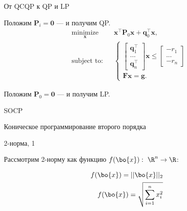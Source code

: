 \documentclass{beamer}
\begin{document}
\begin{frame}{От QCQP к QP и LP}
	\begin{flushleft}
		
		Положим $\mathbf{P}_i = \mathbf{0}$ — и получим QP.
		\begin{equation}
			\begin{aligned}
				& \underset{\mathbf{x}}{\text{minimize}}
				& & \mathbf{x}^\top \mathbf{P}_0 \mathbf{x} + \mathbf{q}_0^\top\mathbf{x}, \\
				& \text{subject to:}
				& & \begin{cases}
					\begin{bmatrix} 
						\mathbf{q}_1^\top \\ ... \\ \mathbf{q}_n^\top
					\end{bmatrix} 
					\mathbf{x} \leq
					\begin{bmatrix} 
						-r_1 \\ ... \\ -r_n
					\end{bmatrix} \\
					\mathbf{F}\mathbf{x} = \mathbf{g}.
				\end{cases}
			\end{aligned}
		\end{equation}
		
		Положим $\mathbf{P}_0 = \mathbf{0}$ — и получим LP.
		
	\end{flushleft}
\end{frame}


\begin{frame}{SOCP}
	
	{\huge Коническое программирование второго порядка}
	
\end{frame}




\begin{frame}{2-норма, 1}
	\begin{flushleft}
		
		Рассмотрим 2-норму как функцию $f(\bo{x}): \ \R^n \rightarrow \R$:
		
		\begin{align}
			f(\bo{x}) = || \bo{x} ||_2
			\\
			f(\bo{x}) = \sqrt{ \sum_{i=1}^n x_i^2 }
		\end{align}
		
	\end{flushleft}
\end{frame}
\end{document}
